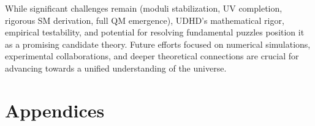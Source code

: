 \documentclass[12pt, a4paper]{article} %
\begin{document}
While significant challenges remain (moduli stabilization, UV completion, rigorous SM derivation, full QM emergence), UDHD's mathematical rigor, empirical testability, and potential for resolving fundamental puzzles position it as a promising candidate theory. Future efforts focused on numerical simulations, experimental collaborations, and deeper theoretical connections are crucial for advancing towards a unified understanding of the universe.

\section*{Appendices}
\appendix
\end{document}

